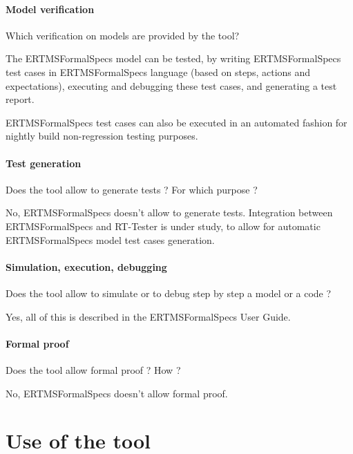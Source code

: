 \paragraph{Model verification}
Which verification on models are provided by the tool?

\begin{author_comment}
The ERTMSFormalSpecs model can be tested, by writing ERTMSFormalSpecs test cases in ERTMSFormalSpecs language (based on steps, actions and expectations), executing and debugging these test cases, and generating a test report. 

ERTMSFormalSpecs test cases can also be executed in an automated fashion for nightly build non-regression testing purposes.
\end{author_comment}

\paragraph{Test generation}
Does the tool allow to generate tests ? For  which purpose ?

\begin{author_comment}
No, ERTMSFormalSpecs doesn't allow to generate tests. Integration between ERTMSFormalSpecs and RT-Tester is under study, to allow for automatic ERTMSFormalSpecs model test cases generation.
\end{author_comment}

\paragraph{Simulation, execution, debugging}
Does the tool allow to simulate or to debug step by step a model or a code ?

\begin{author_comment}
Yes, all of this is described in the ERTMSFormalSpecs User Guide.
\end{author_comment}

\paragraph{Formal proof}
Does the tool allow formal proof ?  How ?

\begin{author_comment}
No, ERTMSFormalSpecs doesn't allow formal proof. 
\end{author_comment}

\section{Use of the tool}

